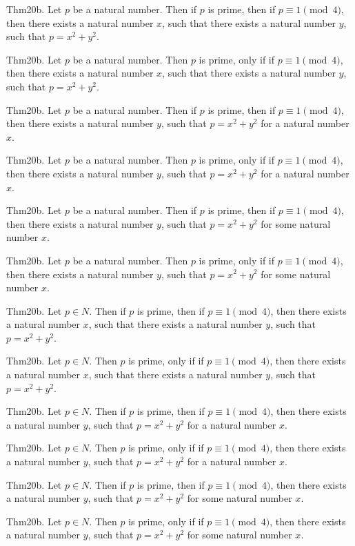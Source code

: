 \documentclass{article}
\begin{document}
Thm20b. Let $p$ be a natural number. Then if $p$ is prime, then if $p \equiv 1 \pmod{ 4}$, then there exists a natural number $x$, such that there exists a natural number $y$, such that $p = x ^{ 2}+ y ^{ 2}$.

Thm20b. Let $p$ be a natural number. Then $p$ is prime, only if if $p \equiv 1 \pmod{ 4}$, then there exists a natural number $x$, such that there exists a natural number $y$, such that $p = x ^{ 2}+ y ^{ 2}$.

Thm20b. Let $p$ be a natural number. Then if $p$ is prime, then if $p \equiv 1 \pmod{ 4}$, then there exists a natural number $y$, such that $p = x ^{ 2}+ y ^{ 2}$ for a natural number $x$.

Thm20b. Let $p$ be a natural number. Then $p$ is prime, only if if $p \equiv 1 \pmod{ 4}$, then there exists a natural number $y$, such that $p = x ^{ 2}+ y ^{ 2}$ for a natural number $x$.

Thm20b. Let $p$ be a natural number. Then if $p$ is prime, then if $p \equiv 1 \pmod{ 4}$, then there exists a natural number $y$, such that $p = x ^{ 2}+ y ^{ 2}$ for some natural number $x$.

Thm20b. Let $p$ be a natural number. Then $p$ is prime, only if if $p \equiv 1 \pmod{ 4}$, then there exists a natural number $y$, such that $p = x ^{ 2}+ y ^{ 2}$ for some natural number $x$.

Thm20b. Let $p \in N$. Then if $p$ is prime, then if $p \equiv 1 \pmod{ 4}$, then there exists a natural number $x$, such that there exists a natural number $y$, such that $p = x ^{ 2}+ y ^{ 2}$.

Thm20b. Let $p \in N$. Then $p$ is prime, only if if $p \equiv 1 \pmod{ 4}$, then there exists a natural number $x$, such that there exists a natural number $y$, such that $p = x ^{ 2}+ y ^{ 2}$.

Thm20b. Let $p \in N$. Then if $p$ is prime, then if $p \equiv 1 \pmod{ 4}$, then there exists a natural number $y$, such that $p = x ^{ 2}+ y ^{ 2}$ for a natural number $x$.

Thm20b. Let $p \in N$. Then $p$ is prime, only if if $p \equiv 1 \pmod{ 4}$, then there exists a natural number $y$, such that $p = x ^{ 2}+ y ^{ 2}$ for a natural number $x$.

Thm20b. Let $p \in N$. Then if $p$ is prime, then if $p \equiv 1 \pmod{ 4}$, then there exists a natural number $y$, such that $p = x ^{ 2}+ y ^{ 2}$ for some natural number $x$.

Thm20b. Let $p \in N$. Then $p$ is prime, only if if $p \equiv 1 \pmod{ 4}$, then there exists a natural number $y$, such that $p = x ^{ 2}+ y ^{ 2}$ for some natural number $x$.
\end{document}
